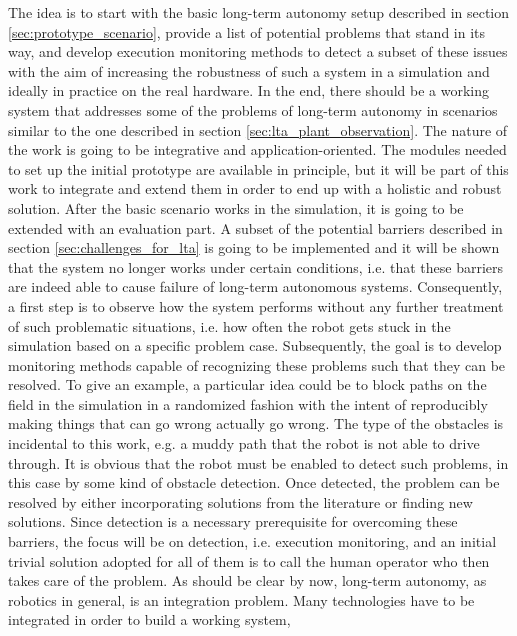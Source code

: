\documentclass[english, master, utf8]{base/thesis_KBS}
\begin{document}
The idea is to start with the basic long-term autonomy setup described in section \ref{sec:prototype_scenario}, provide a list of potential problems that 
stand in its way, and develop execution monitoring methods to detect a subset of these issues with the aim of increasing the robustness of such a system in a simulation
and ideally in practice on the real hardware. In the end, there should be a working system that addresses some of the problems of long-term autonomy 
in scenarios similar to the one described in section \ref{sec:lta_plant_observation}. The nature of the work is going to be integrative and application-oriented. The modules 
needed to set up the initial prototype are available in principle, but it will be part of this work to integrate and extend them in order to end up with a holistic and robust
solution. After the basic scenario works in the simulation, it is going to be extended with an evaluation part. A subset of the potential barriers described in section 
\ref{sec:challenges_for_lta} is going to be implemented and it will be shown that the system no longer works under certain conditions, i.e. that these
barriers are indeed able to cause failure of long-term autonomous systems. Consequently, a first step is to observe how the system performs without any further 
treatment of such problematic situations, i.e. how often the robot gets stuck in the simulation based on a specific problem case.
Subsequently, the goal is to develop monitoring methods capable of recognizing these problems such that they can be resolved.
To give an example, a particular idea could be to block paths on the field in the simulation in a randomized fashion with the intent of reproducibly making things that 
can go wrong actually go wrong. The type of the obstacles is incidental to this work, e.g. a muddy path that the robot is not able to drive through. 
It is obvious that the robot must be enabled to detect such problems, in this case by some kind of obstacle detection.
Once detected, the problem can be resolved by either incorporating solutions from the literature or finding new solutions.
Since detection is a necessary prerequisite for overcoming these barriers, the focus will be on detection, i.e. execution monitoring,
and an initial trivial solution adopted for all of them is to call the human operator who then takes care of the problem.\newline
As should be clear by now, long-term autonomy, as robotics in general, is an integration problem. Many technologies have to be integrated in order to build a working system, 
\end{document}
